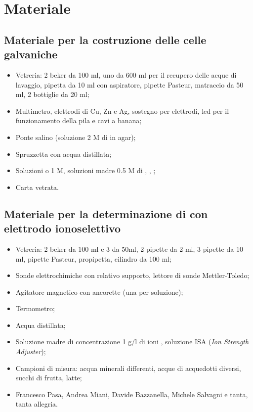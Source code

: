 \section*{Materiale}

\subsection*{Materiale per la costruzione delle celle galvaniche}

\begin{itemize}
        \setlength{\parskip}{0pt}
        \item{Vetreria: 2 beker da 100 ml, uno da 600 ml per il recupero delle acque di lavaggio, 
            pipetta da 10 ml con aspiratore, pipette Pasteur,
            matraccio da 50 ml, 2 bottiglie da 20 ml;}
        \item{Multimetro, elettrodi di Cu, Zn e Ag,
            sostegno per elettrodi, led per il funzionamento della pila e cavi a banana;}
        \item{Ponte salino (soluzione 2 M di  in agar);}
        \item{Spruzzetta con acqua distillata;}
        \item{Soluzioni  o  1 M, soluzioni madre 0.5 M di , , ;}
        \item{Carta vetrata.}
\end{itemize}

\subsection*{Materiale per la determinazione di  con elettrodo ionoselettivo}

\begin{itemize}
        \setlength{\parskip}{0pt}
        \item{Vetreria: 2 beker da 100 ml e 3 da 50ml, 2 pipette da 2 ml, 3 pipette da 10 ml,
        		pipette Pasteur, propipetta, cilindro da 100 ml;}
        \item{Sonde elettrochimiche con relativo supporto, lettore di sonde Mettler-Toledo;}
        \item{Agitatore magnetico con ancorette (una per soluzione);}
        \item{Termometro;}
        \item{Acqua distillata;}
        \item{Soluzione madre di concentrazione 1 g/l di ioni , soluzione ISA (\emph{Ion Strength
            Adjuster});}
        \item{Campioni di misura: acqua minerali differenti, acque di acquedotti diversi, succhi di frutta, latte;}
        \item{Francesco Pasa, Andrea Miani, Davide Bazzanella, Michele Salvagni e tanta, tanta allegria.}
\end{itemize}
